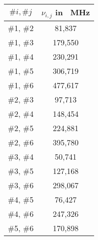 \begin{table}[H]
    \begin{minipage}{8cm}
        \centering
        \begin{tabular}{|c|c|}
            \hline
            $\#i, \#j$      &       $\nu_{i,j}$ in \SI{}{\mega \hertz} \\
            \hline
            \hline
            \cellcolor{green!40} \#1, \#2       &   \cellcolor{green!40}     81,837         \\
            \hline
            \cellcolor{red!20}   \#1, \#3       &   \cellcolor{red!20}      179,550         \\
            \hline
            \cellcolor{gray!20}  \#1, \#4       &   \cellcolor{gray!20}     230,291         \\
            \hline
            \cellcolor{red!20}   \#1, \#5       &   \cellcolor{red!20}      306,719         \\
            \hline
            \cellcolor{gray!20}  \#1, \#6       &   \cellcolor{gray!20}     477,617         \\
            \hline
            \cellcolor{red!20}   \#2, \#3       &   \cellcolor{red!20}       97,713         \\
            \hline
            \cellcolor{green!40} \#2, \#4       &   \cellcolor{green!40}    148,454         \\
            \hline
            \cellcolor{red!20}   \#2, \#5       &   \cellcolor{red!20}      224,881         \\
            \hline
            \cellcolor{gray!20}  \#2, \#6       &   \cellcolor{gray!20}     395,780         \\
            \hline
            \cellcolor{red!20}   \#3, \#4       &   \cellcolor{red!20}       50,741         \\
            \hline
            \cellcolor{red!20}   \#3, \#5       &   \cellcolor{red!20}      127,168         \\
            \hline          
            \cellcolor{red!20}   \#3, \#6       &   \cellcolor{red!20}      298,067         \\
            \hline
            \cellcolor{red!20}   \#4, \#5       &   \cellcolor{red!20}       76,427         \\
            \hline
            \cellcolor{green!40} \#4, \#6       &   \cellcolor{green!40}    247,326         \\
            \hline
            \cellcolor{red!20}   \#5, \#6       &   \cellcolor{red!20}      170,898         \\

\end{tabular}
\end{minipage}
\end{table}
